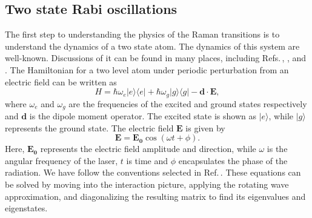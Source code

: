 \subsection{Two state Rabi oscillations}
\label{twoStateSection}
The first step to understanding the physics of the Raman transitions is to understand the dynamics of a two state atom. The dynamics of this system are well-known. Discussions of it can be found in many places, including Refs.\,\cite{cohenTannoudji}, \cite{demilleBudkerKimball}, and \cite{Young1997363}. The Hamiltonian for a two level atom under periodic perturbation from an electric field can be written as 
\begin{equation}
H = \hbar \omega_e |e\rangle\langle e| + \hbar \omega_g |g\rangle\langle g| - \mathbf{d}\cdot\mathbf{E},
\end{equation}  
where $\omega_e$ and $\omega_g$ are the frequencies of the excited and ground states respectively and $\mathbf{d}$ is the dipole moment operator. The excited state is shown as $|e\rangle$, while $|g\rangle$ represents the ground state. The electric field $\mathbf{E}$ is given by 
\begin{equation}
\mathbf{E} = \mathbf{E_0} \cos (\omega t + \phi).
\end{equation}
Here, $\mathbf{E_0}$ represents the electric field amplitude and direction, while $\omega$ is the angular frequency of the laser, $t$ is time and $\phi$ encapsulates the phase of the radiation.
We have follow the conventions selected in Ref.\,\cite{Young1997363}. 
These equations can be solved by moving into the interaction picture, applying the rotating wave approximation, and diagonalizing the resulting matrix to find its eigenvalues and eigenstates.

